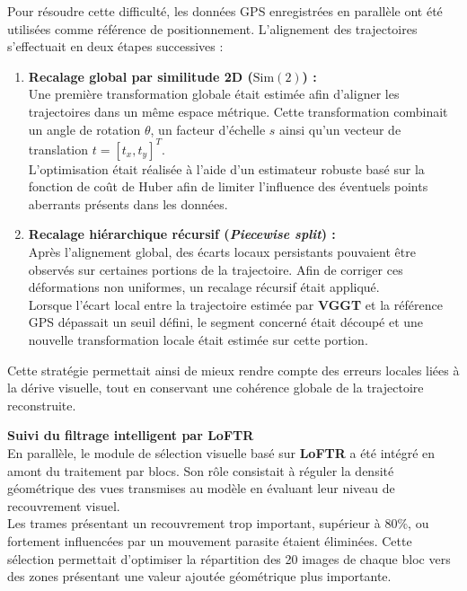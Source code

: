 \documentclass[12pt,a4paper,oneside]{report}
\begin{document}
\hspace*{.3cm}Pour résoudre cette difficulté, les données GPS enregistrées en parallèle ont été utilisées comme référence de positionnement. L'alignement des trajectoires s'effectuait en deux étapes successives :

\begin{enumerate}[label=$\bullet$, itemsep=0.5em]

    \item \textbf{Recalage global par similitude 2D ($\text{Sim}(2)$) :}\\
    Une première transformation globale était estimée afin d'aligner les trajectoires dans un même espace métrique. Cette transformation combinait un angle de rotation $\theta$, un facteur d'échelle $s$ ainsi qu'un vecteur de translation $t = [t_x, t_y]^T$.\\
    L'optimisation était réalisée à l'aide d'un estimateur robuste basé sur la fonction de coût de Huber afin de limiter l'influence des éventuels points aberrants présents dans les données.

    \item \textbf{Recalage hiérarchique récursif (\textit{Piecewise split}) :}\\
    Après l'alignement global, des écarts locaux persistants pouvaient être observés sur certaines portions de la trajectoire. Afin de corriger ces déformations non uniformes, un recalage récursif était appliqué.\\
    Lorsque l'écart local entre la trajectoire estimée par \textbf{VGGT} et la référence GPS dépassait un seuil défini, le segment concerné était découpé et une nouvelle transformation locale était estimée sur cette portion.

\end{enumerate}

\par\bigskip
Cette stratégie permettait ainsi de mieux rendre compte des erreurs locales liées à la dérive visuelle, tout en conservant une cohérence globale de la trajectoire reconstruite.

\newpage

\hspace*{0.4cm}\textbf{Suivi du filtrage intelligent par LoFTR}\\

\hspace*{.3cm}En parallèle, le module de sélection visuelle basé sur \textbf{LoFTR} a été intégré en amont du traitement par blocs. Son rôle consistait à réguler la densité géométrique des vues transmises au modèle en évaluant leur niveau de recouvrement visuel.\\
\hspace*{.3cm}Les trames présentant un recouvrement trop important, supérieur à $80\%$, ou fortement influencées par un mouvement parasite étaient éliminées. Cette sélection permettait d'optimiser la répartition des 20 images de chaque bloc vers des zones présentant une valeur ajoutée géométrique plus importante.\\
\end{document}
